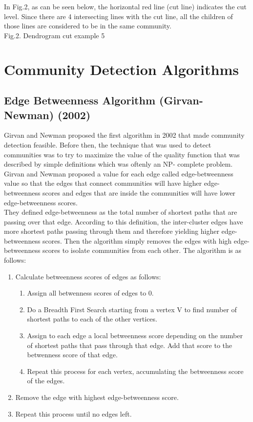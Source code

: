 \documentclass[10pt]{article}
\begin{document}
In Fig.2, as can be seen below, the horizontal red line (cut line) indicates the cut level. Since there are 4 intersecting lines with the cut line, all the children of those lines are considered to be in the same community. \\

Fig.2. Dendrogram cut example 5 \\

\section{Community Detection Algorithms}

\subsection{Edge Betweenness Algorithm (Girvan-Newman) (2002)}

Girvan and Newman proposed the first algorithm in 2002 that made community detection feasible. Before then, the technique that was used to detect communities was to try to maximize the value of the quality function that was described by simple definitions which was oftenly an NP- complete problem. \\

Girvan and Newman proposed a value for each edge called edge-betweenness value so that the edges that connect communities will have higher edge-betweenness scores and edges that are inside the communities will have lower edge-betweenness scores\cite{raghavan}. \\

They defined edge-betweenness as the total number of shortest paths that are passing over that edge. According to this definition, the inter-cluster edges have more shortest paths passing through them and therefore yielding higher edge-betweenness scores. Then the algorithm simply removes the edges with high edge-betweenness scores to isolate communities from each other\cite{raghavan}. The algorithm is as follows: \\

\begin{enumerate}
\item Calculate betweenness scores of edges as follows:
\begin{enumerate}
\item Assign all betwenness scores of edges to 0.
\item Do a Breadth First Search starting from a vertex V to find number of shortest paths to each of the other vertices.
\item Assign to each edge a local betweenness score depending on the number of shortest paths that pass through that edge. Add that score to the betwenness score of that edge.
\item Repeat this process for each vertex, accumulating the betweenness score of the edges.
\end{enumerate}
\item Remove the edge with highest edge-betweenness score.
\item Repeat this process until no edges left.
\end{enumerate}
\end{document}
